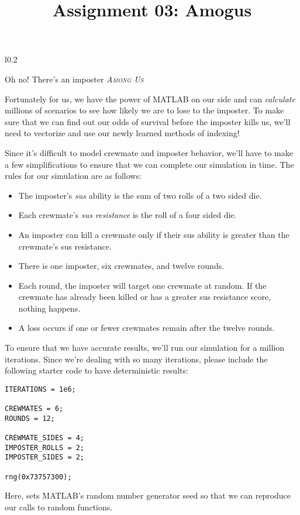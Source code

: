 \documentclass{article}
\title{Assignment 03: Amogus}
\begin{document}
\renderTitle

\begin{wrapfigure}{l}{0.2\textwidth}
\end{wrapfigure}

Oh no!  There's an imposter \textit{\textsc{Among Us}} 

Fortunately for us, we have the power of MATLAB on our side and can
\emph{calculate} millions of scenarios to see how likely we are to lose
to the imposter.  To make sure that we can find out our odds of survival
before the imposter kills us, we'll need to vectorize and use our newly
learned methods of indexing!

Since it's difficult to model crewmate and imposter behavior, we'll have
to make a few simplifications to ensure that we can complete our
simulation in time.  The rules for our simulation are as follows:

\begin{itemize}[leftmargin=*]
	\item
		The imposter's \emph{sus} ability is the sum of two
		rolls of a two sided die.

	\item
		Each crewmate's \emph{sus resistance} is the roll of a
		four sided die.

	\item
		An imposter can kill a crewmate only if their sus ability is
		greater than the crewmate's sus resistance.

	\item
		There is one imposter, six crewmates, and twelve rounds.

	\item
		Each round, the imposter will target one crewmate at
		random.  If the crewmate has already been killed or has
		a greater sus resistance score, nothing happens.

	\item
		A loss occurs if one or fewer crewmates remain after the
		twelve rounds.
\end{itemize}

To ensure that we have accurate results, we'll run our simulation for a
million iterations.  Since we're dealing with so many iterations, please
include the following starter code to have deterministic results:

\begin{verbatim}
ITERATIONS = 1e6;

CREWMATES = 6;
ROUNDS = 12;

CREWMATE_SIDES = 4;
IMPOSTER_ROLLS = 2;
IMPOSTER_SIDES = 2;

rng(0x73757300);
\end{verbatim}

Here,  sets MATLAB's random number generator seed so that we can
reproduce our calls to random functions.
\end{document}
